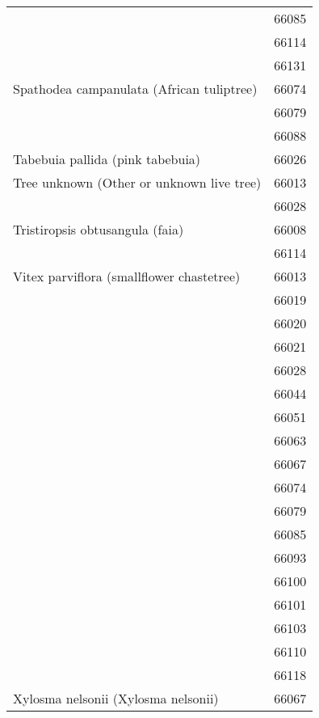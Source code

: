 \begin{longtable}{ll}
                                    & 66085 \\
                                    & 66114 \\
                                    & 66131 \\
\midrule
Spathodea campanulata (African tuliptree) & 66074 \\
                                    & 66079 \\
                                    & 66088 \\
\midrule
Tabebuia pallida (pink tabebuia) & 66026 \\
\midrule
Tree unknown (Other or unknown live tree) & 66013 \\
                                    & 66028 \\
\midrule
Tristiropsis obtusangula (faia) & 66008 \\
                                    & 66114 \\
\midrule
Vitex parviflora (smallflower chastetree) & 66013 \\
                                    & 66019 \\
                                    & 66020 \\
                                    & 66021 \\
                                    & 66028 \\
                                    & 66044 \\
                                    & 66051 \\
                                    & 66063 \\
                                    & 66067 \\
                                    & 66074 \\
                                    & 66079 \\
                                    & 66085 \\
                                    & 66093 \\
                                    & 66100 \\
                                    & 66101 \\
                                    & 66103 \\
                                    & 66110 \\
                                    & 66118 \\
\midrule
Xylosma nelsonii (Xylosma nelsonii) & 66067 \\
\end{longtable}
